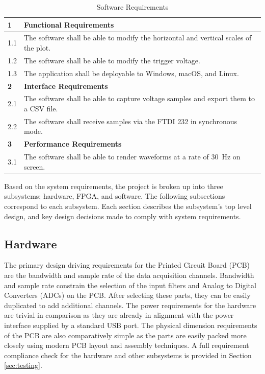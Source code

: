 \documentclass[letterpaper,11pt]{article}
\begin{document}
\begin{table}[H]
  \caption{Software Requirements}
  \begin{tabularx}{\textwidth}{l|l}
    \textbf{1} & \textbf{Functional Requirements}\\
    \hline
    1.1 & The software shall be able to modify the horizontal and vertical scales of the plot. \\
    1.2 & The software shall be able to modify the trigger voltage. \\
    1.3 & The application shall be deployable to Windows, macOS, and Linux. \\
    \hline
    \textbf{2} & \textbf{Interface Requirements} \\
    \hline
    2.1 & The software shall be able to capture voltage samples and export them to a CSV file. \\
    2.2 & The software shall receive samples via the FTDI 232 in synchronous mode. \\
    \hline
    \textbf{3} & \textbf{Performance Requirements} \\
    \hline
    3.1 & The software shall be able to render waveforms at a rate of \SI{30}{\hertz} on screen.
  \end{tabularx} 
  \label{tab:sw-reqs}
\end{table}

Based on the system requirements, the project is broken up into three
subsystems; hardware, FPGA, and software. The following subsections correspond
to each subsystem. Each section describes the subsystem's top level design, and
key design decisions made to comply with system requirements.

\subsection{Hardware} %
The primary design driving requirements for the Printed Circuit Board (PCB) are
the bandwidth and sample rate of the data acquisition channels. Bandwidth and
sample rate constrain the selection of the input filters and Analog to Digital
Converters (ADCs) on the PCB. After selecting these parts, they can be easily
duplicated to add additional channels. The power requirements for the hardware
are trivial in comparison as they are already in alignment with the power
interface supplied by a standard USB port. The physical dimension requirements
of the PCB are also comparatively simple as the parts are easily packed more
closely using modern PCB layout and assembly techniques. A full requirement
compliance check for the hardware and other subsystems is provided in Section
\ref{sec:testing}.
\end{document}
